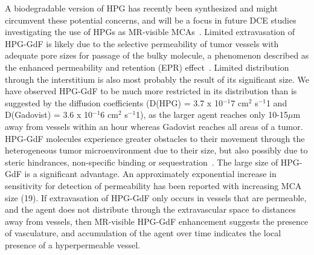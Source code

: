 A biodegradable version of HPG has recently been synthesized and might circumvent these potential concerns, and will be a focus in future DCE studies investigating the use of HPGs as MR-visible MCAs~\cite{Shenoi:2013id}.
Limited extravasation of HPG-GdF is likely due to the selective permeability of tumor vessels with adequate pore sizes for passage of the bulky molecule, a phenomenon described as the enhanced permeability and retention (EPR) effect~\cite{Maeda:2013hq}.
Limited distribution through the interstitium is also most probably the result of its significant size.
We have observed HPG-GdF to be much more restricted in its distribution than is suggested by the diffusion coefficients (D(HPG) = 3.7 x 10$^{-1}$7 cm$^2$ s$^{-1}$1 and D(Gadovist) = 3.6 x 10$^{-1}$6 cm$^2$ s$^{-1}$1), as the larger agent reaches only 10-15$\mu$m away from vessels within an hour whereas Gadovist reaches all areas of a tumor.
HPG-GdF molecules experience greater obstacles to their movement through the heterogeneous tumor microenvironment due to their size, but also possibly due to steric hindrances, non-specific binding or sequestration~\cite{Minchinton:2006gs}.
The large size of HPG-GdF is a significant advantage.
An approximately exponential increase in sensitivity for detection of permeability has been reported with increasing MCA size (19).
If extravasation of HPG-GdF only occurs in vessels that are permeable, and the agent does not distribute through the extravascular space to distances away from vessels, then MR-visible HPG-GdF enhancement suggests the presence of vasculature, and accumulation of the agent over time indicates the local presence of a hyperpermeable vessel.

